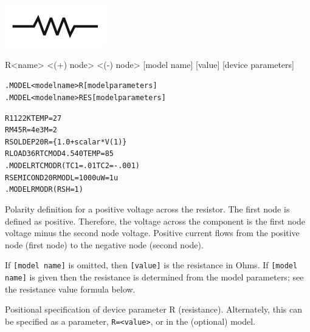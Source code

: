 


\begin{Device}

\symbol
{\includegraphics{resistorSymbol}}

\device
R<name> <(+) node> <(-) node> [model name] [value] [device parameters]

\model
\begin{alltt}
.MODEL <model name> R [model parameters]
.MODEL <model name> RES [model parameters]
\end{alltt}

\examples
\begin{alltt}
R1 1 2 2K TEMP=27
RM 4 5 R=4e3 M=2
RSOLDEP 2 0 R=\{1.0+scalar*V(1)\}
RLOAD 3 6 RTCMOD 4.540 TEMP=85
.MODEL RTCMOD R (TC1=.01 TC2=-.001)
RSEMICOND 2 0 RMOD L=1000u W=1u
.MODEL RMOD R (RSH=1)
\end{alltt}

\parameters

\begin{Parameters}


Polarity definition for a positive voltage across the resistor. The
first node is defined as positive. Therefore, the voltage across the
component is the first node voltage minus the second node voltage.
Positive current flows from the positive node (first node) to the
negative node (second node).


If \texttt{[model name]} is omitted, then \texttt{[value]} is the
resistance in Ohms. If \texttt{[model name]} is given then the
resistance is determined from the model parameters; see the resistance
value formula below.


Positional specification of device parameter R (resistance).
Alternately, this can be specified as a parameter, \texttt{R=<value>},
or in the (optional) model.


\end{Parameters}
\end{Device}
